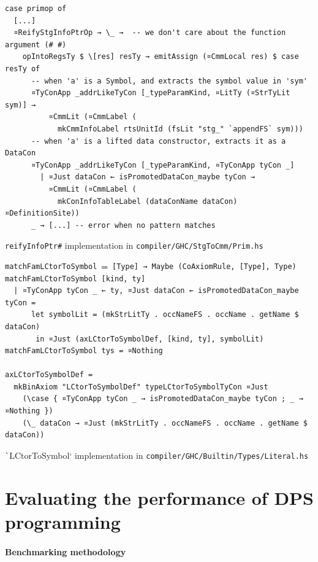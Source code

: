 \documentclass[english]{jflart}
\begin{document}
\begin{table}[p]
\small
\begin{verbatim}
case primop of
  [...]
  ¤ReifyStgInfoPtrOp → \_ →  -- we don't care about the function argument (# #)
    opIntoRegsTy $ \[res] resTy → emitAssign (¤CmmLocal res) $ case resTy of
      -- when 'a' is a Symbol, and extracts the symbol value in 'sym'
      ¤TyConApp _addrLikeTyCon [_typeParamKind, ¤LitTy (¤StrTyLit sym)] →
          ¤CmmLit (¤CmmLabel (
            mkCmmInfoLabel rtsUnitId (fsLit "stg_" `appendFS` sym)))
      -- when 'a' is a lifted data constructor, extracts it as a DataCon
      ¤TyConApp _addrLikeTyCon [_typeParamKind, ¤TyConApp tyCon _]
        | ¤Just dataCon ← isPromotedDataCon_maybe tyCon →
          ¤CmmLit (¤CmmLabel (
            mkConInfoTableLabel (dataConName dataCon) ¤DefinitionSite))
      _ → [...] -- error when no pattern matches
\end{verbatim}
\caption{\texttt{reifyInfoPtr\#} implementation in \texttt{compiler/GHC/StgToCmm/Prim.hs}}
\label{table:impl-reifyInfoPtr}
\end{table}

\begin{table}[p]
\small
\begin{verbatim}
matchFamLCtorToSymbol ⩴ [Type] → Maybe (CoAxiomRule, [Type], Type)
matchFamLCtorToSymbol [kind, ty]
  | ¤TyConApp tyCon _ ← ty, ¤Just dataCon ← isPromotedDataCon_maybe tyCon =
      let symbolLit = (mkStrLitTy . occNameFS . occName . getName $ dataCon)
       in ¤Just (axLCtorToSymbolDef, [kind, ty], symbolLit)
matchFamLCtorToSymbol tys = ¤Nothing

axLCtorToSymbolDef =
  mkBinAxiom "LCtorToSymbolDef" typeLCtorToSymbolTyCon ¤Just
    (\case { ¤TyConApp tyCon _ → isPromotedDataCon_maybe tyCon ; _ → ¤Nothing })
    (\_ dataCon → ¤Just (mkStrLitTy . occNameFS . occName . getName $ dataCon))
\end{verbatim}
\caption{\texttt`LCtorToSymbol` implementation in \texttt{compiler/GHC/Builtin/Types/Literal.hs}}
\label{table:impl-LCtorToSymbol}
\end{table}

\section{Evaluating the performance of DPS programming}\label{sec:benchmark}

\paragraph{Benchmarking methodology}
\end{document}
